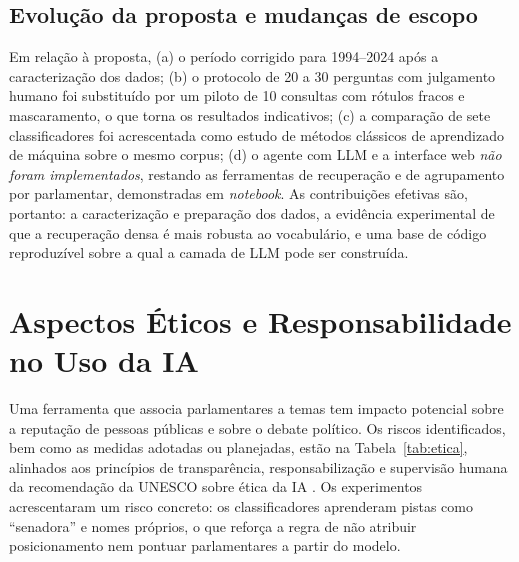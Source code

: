 \documentclass[12pt]{article}
\begin{document}
\subsection{Evolução da proposta e mudanças de escopo}\label{sec:evolucao}

Em relação à proposta, (a) o período corrigido para 1994--2024 após a caracterização dos dados;
(b) o protocolo de 20 a 30 perguntas com julgamento humano foi substituído por um piloto de 10
consultas com rótulos fracos e mascaramento, o que torna os resultados indicativos; (c) a
comparação de sete classificadores foi acrescentada como estudo de métodos clássicos de
aprendizado de máquina sobre o mesmo corpus; (d) o agente com LLM e a interface web
\emph{não foram implementados}, restando as ferramentas de recuperação e de agrupamento por
parlamentar, demonstradas em \textit{notebook}. As contribuições efetivas são, portanto: a
caracterização e preparação dos dados, a evidência experimental de que a recuperação densa é mais
robusta ao vocabulário, e uma base de código reproduzível sobre a qual a camada de LLM pode ser
construída.

\section{Aspectos Éticos e Responsabilidade no Uso da IA}\label{sec:etica}

Uma ferramenta que associa parlamentares a temas tem impacto potencial sobre a reputação de
pessoas públicas e sobre o debate político. Os riscos identificados, bem como as medidas adotadas
ou planejadas, estão na Tabela~\ref{tab:etica}, alinhados aos princípios de transparência,
responsabilização e supervisão humana da recomendação da UNESCO sobre ética da IA
\cite{unesco2021}. Os experimentos acrescentaram um risco concreto: os classificadores aprenderam
pistas como ``senadora'' e nomes próprios, o que reforça a regra de não atribuir posicionamento nem
pontuar parlamentares a partir do modelo.
\end{document}
